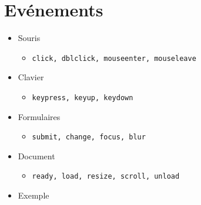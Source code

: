 \hypertarget{evuxe9nements}{%
\section{Evénements}\label{evuxe9nements}}

\begin{itemize}
\tightlist
\item
  Souris

  \begin{itemize}
  \tightlist
  \item
    \begin{otherlanguage}{english}\texttt{click,\ dblclick,\ mouseenter,\ mouseleave}\end{otherlanguage}
  \end{itemize}
\item
  Clavier

  \begin{itemize}
  \tightlist
  \item
    \begin{otherlanguage}{english}\texttt{keypress,\ keyup,\ keydown}\end{otherlanguage}
  \end{itemize}
\item
  Formulaires

  \begin{itemize}
  \tightlist
  \item
    \begin{otherlanguage}{english}\texttt{submit,\ change,\ focus,\ blur}\end{otherlanguage}
  \end{itemize}
\item
  Document

  \begin{itemize}
  \tightlist
  \item
    \begin{otherlanguage}{english}\texttt{ready,\ load,\ resize,\ scroll,\ unload}\end{otherlanguage}
  \end{itemize}
\item
  Exemple
\end{itemize}

\begin{otherlanguage}{english}

\begin{Shaded}
\begin{Highlighting}[]
\AttributeTok{$}\NormalTok{(}\NormalTok{(}\NormalTok{()}\OperatorTok{\{}
\OperatorTok{\}}\NormalTok{)}\OperatorTok{;} 
\end{Highlighting}
\end{Shaded}

\end{otherlanguage}

